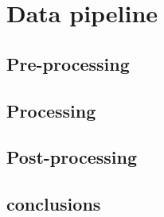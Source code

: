 \section{Data pipeline} \label{section:pipeline}

\subsection{Pre-processing}
\subsection{Processing}
\subsection{Post-processing}

\subsection{conclusions}

